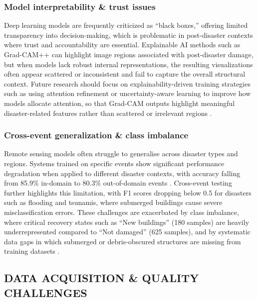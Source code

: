 \documentclass[conference,a4paper]{IEEEtran}
\begin{document}
\subsubsection{\textbf{Model interpretability \& trust issues}}
Deep learning models are frequently criticized as ``black boxes,'' offering limited transparency into decision-making, which is problematic in post-disaster contexts where trust and accountability are essential. Explainable AI methods such as Grad-CAM++ can highlight image regions associated with post-disaster damage, but when models lack robust internal representations, the resulting visualizations often appear scattered or inconsistent and fail to capture the overall structural context. Future research should focus on explainability-driven training strategies such as using attention refinement or uncertainty-aware learning to improve how models allocate attention, so that Grad-CAM outputs highlight meaningful disaster-related features rather than scattered or irrelevant regions \cite{lagapEnhancingPostDisasterDamage2025}.

\subsubsection{\textbf{Cross-event generalization \& class imbalance}}
Remote sensing models often struggle to generalise across disaster types and regions. Systems trained on specific events show significant performance degradation when applied to different disaster contexts, with accuracy falling from 85.9\% in-domain to 80.3\% out-of-domain events \cite{kimDisasterAssessmentUsing2022}. Cross-event testing further highlights this limitation, with F1 scores dropping below 0.5 for disasters such as flooding and tsunamis, where submerged buildings cause severe misclassification errors. These challenges are exacerbated by class imbalance, where critical recovery states such as ``New buildings'' (180 samples) are heavily underrepresented compared to ``Not damaged'' (625 samples), and by systematic data gaps in which submerged or debris-obscured structures are missing from training datasets \cite{lagapEnhancingPostDisasterDamage2025}.


\subsection{DATA ACQUISITION \& QUALITY CHALLENGES}
\end{document}
